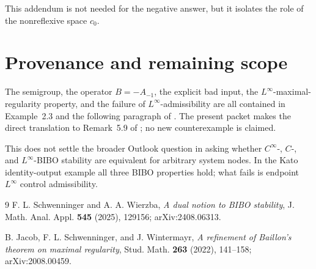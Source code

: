 \documentclass[11pt]{article}
\begin{document}
This addendum is not needed for the negative answer, but it isolates the role
of the nonreflexive space $c_0$.

\section{Provenance and remaining scope}

The semigroup, the operator $B=-A_{-1}$, the explicit bad input, the
$L^\infty$-maximal-regularity property, and the failure of
$L^\infty$-admissibility are all contained in Example~2.3 and the following
paragraph of \cite{support}.  The present packet makes the direct translation
to Remark~5.9 of \cite{source}; no new counterexample is claimed.

This does not settle the broader Outlook question in \cite{source} asking
whether $C^\infty$-, $C$-, and $L^\infty$-BIBO stability are equivalent for
arbitrary system nodes.  In the Kato identity-output example all three BIBO
properties hold; what fails is endpoint $L^\infty$ control admissibility.

\small
\begin{thebibliography}{9}
F. L. Schwenninger and A. A. Wierzba,
\emph{A dual notion to BIBO stability},
J. Math. Anal. Appl. \textbf{545} (2025), 129156;
arXiv:2408.06313.

B. Jacob, F. L. Schwenninger, and J. Wintermayr,
\emph{A refinement of Baillon's theorem on maximal regularity},
Stud. Math. \textbf{263} (2022), 141--158;
arXiv:2008.00459.
\end{thebibliography}
\end{document}
